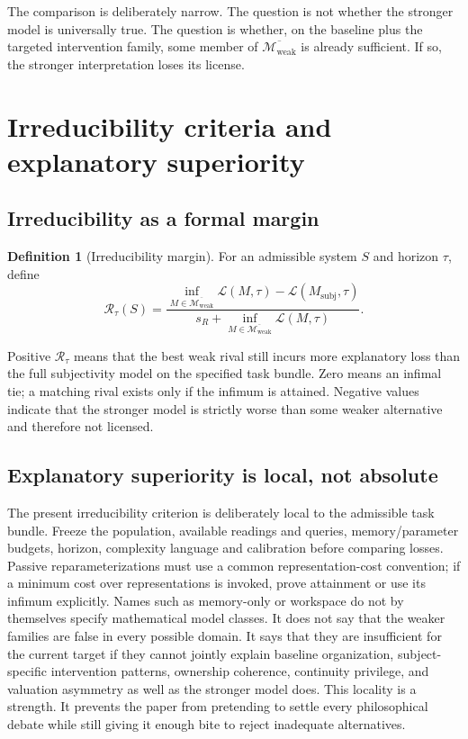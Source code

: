 \documentclass[11pt,a4paper]{article}
\theoremstyle{definition}
\newtheorem{definition}[theorem]{Definition}
\newcommand{\WeakFam}{\mathcal{M}_{\mathrm{weak}}}
\newcommand{\WeakClosure}{\overline{\WeakFam}}
\newcommand{\Irred}{\mathcal{R}}
\newcommand{\Loss}{\mathcal{L}}
\begin{document}
The comparison is deliberately narrow. The question is not whether the stronger model is universally true. The question is whether, on the baseline plus the targeted intervention family, some member of $\WeakClosure$ is already sufficient. If so, the stronger interpretation loses its license.

\section{Irreducibility criteria and explanatory superiority}
\subsection{Irreducibility as a formal margin}
\begin{definition}[Irreducibility margin]
For an admissible system $S$ and horizon $\tau$, define
\[
\Irred_\tau(S)=
\frac{\inf_{M\in\WeakClosure}\Loss(M,\tau)-\Loss(M_{\mathrm{subj}},\tau)}
{s_R+\inf_{M\in\WeakClosure}\Loss(M,\tau)}.
\]
\end{definition}

Positive $\Irred_\tau$ means that the best weak rival still incurs more explanatory loss than the full subjectivity model on the specified task bundle. Zero means an infimal tie; a matching rival exists only if the infimum is attained. Negative values indicate that the stronger model is strictly worse than some weaker alternative and therefore not licensed.

\subsection{Explanatory superiority is local, not absolute}
The present irreducibility criterion is deliberately local to the admissible task bundle. Freeze the population, available readings and queries, memory/parameter budgets, horizon, complexity language and calibration before comparing losses. Passive reparameterizations must use a common representation-cost convention; if a minimum cost over representations is invoked, prove attainment or use its infimum explicitly. Names such as memory-only or workspace do not by themselves specify mathematical model classes. It does not say that the weaker families are false in every possible domain. It says that they are insufficient for the current target if they cannot jointly explain baseline organization, subject-specific intervention patterns, ownership coherence, continuity privilege, and valuation asymmetry as well as the stronger model does. This locality is a strength. It prevents the paper from pretending to settle every philosophical debate while still giving it enough bite to reject inadequate alternatives.
\end{document}

